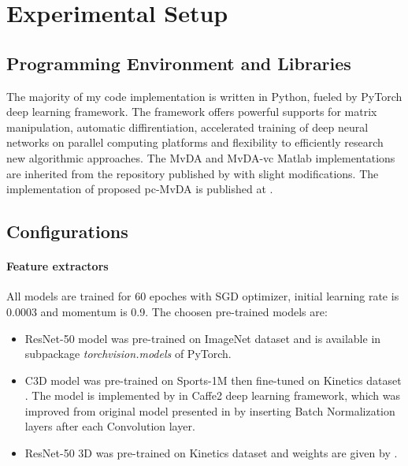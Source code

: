 
\section{Experimental Setup} \label{sec:experimental_setup}
    \subsection{Programming Environment and Libraries}
        The majority of my code implementation is written in Python, fueled by PyTorch \cite{NEURIPS2019_9015} deep learning framework.
        The framework offers powerful supports for matrix manipulation, automatic diffirentiation, accelerated training of deep neural networks on parallel computing platforms and flexibility to efficiently research new algorithmic approaches.
        The MvDA and MvDA-vc Matlab implementations are inherited from the repository published by \cite{kan2015multi} with slight modifications.
        The implementation of proposed pc-MvDA is published at .

    \subsection{Configurations}
        \paragraph{Feature extractors}
        All models are trained for 60 epoches with SGD optimizer, initial learning rate is 0.0003 and momentum is 0.9.
        The choosen pre-trained models are:
        \begin{itemize}
            \item{ResNet-50} model was pre-trained on ImageNet dataset and is available in subpackage \textit{torchvision.models} of PyTorch.
            \item{C3D} model was pre-trained on Sports-1M \cite{karpathy2014large} then fine-tuned on Kinetics dataset \cite{kay2017kinetics}. The model is implemented by \cite{VMZ} in Caffe2 deep learning framework, which was improved from original model presented in \cite{tran2015learning} by inserting Batch Normalization layers after each Convolution layer.
            \item{ResNet-50 3D} was pre-trained on Kinetics dataset and weights are given by \cite{hara2018can}.
        \end{itemize}

